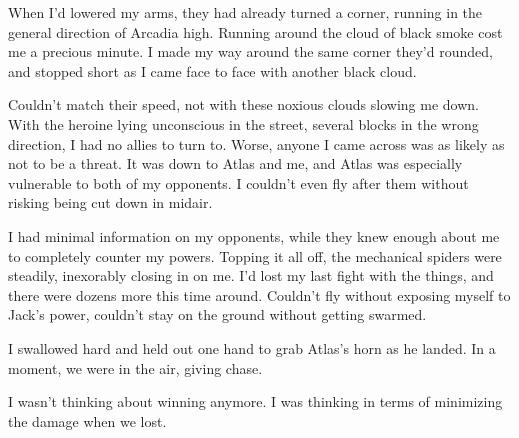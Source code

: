 When I'd lowered my arms, they had already turned a corner, running in the general direction of Arcadia high.  Running around the cloud of black smoke cost me a precious minute.  I made my way around the same corner they'd rounded, and stopped short as I came face to face with another black cloud.



Couldn't match their speed, not with these noxious clouds slowing me down.  With the heroine lying unconscious in the street, several blocks in the wrong direction, I had no allies to turn to.  Worse, anyone I came across was as likely as not to be a threat. It was down to Atlas and me, and Atlas was especially vulnerable to both of my opponents.  I couldn't even fly after them without risking being cut down in midair.



I had minimal information on my opponents, while they knew enough about me to completely counter my powers.  Topping it all off, the mechanical spiders were steadily, inexorably closing in on me.  I'd lost my last fight with the things, and there were dozens more this time around.  Couldn't fly without exposing myself to Jack's power, couldn't stay on the ground without getting swarmed.



I swallowed hard and held out one hand to grab Atlas's horn as he landed.  In a moment, we were in the air, giving chase.



I wasn't thinking about winning anymore.  I was thinking in terms of minimizing the damage when we lost.





